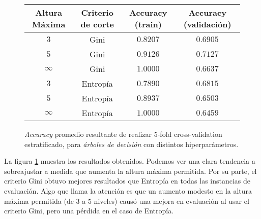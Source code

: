 \vspace{0.5em}
\begin{figure}[!htbp]
    \begin{center}
        \begin{tabular}{ |c|c|c|c| } 
         \hline
        Altura Máxima   & Criterio de corte & Accuracy (train)  & Accuracy (validación) \\
        \hline
        $3$             & Gini              &  $0.8207$         & $0.6905$  \\ 
        $5$             & Gini              &  $0.9126$         & $0.7127$  \\
        $\infty$        & Gini              &  $1.0000$         & $0.6637$  \\ 
        $3$             & Entropía          &  $0.7890$         & $0.6815$  \\
        $5$             & Entropía          &  $0.8937$         & $0.6503$  \\ 
        $\infty$        & Entropía          &  $1.0000$         & $0.6459$  \\ 
        \hline
        \end{tabular}
    \end{center}
    \caption{\textit{Accuracy} promedio resultante de realizar $5$-fold cross-validation estratificado, para \textit{árboles de decisión} con distintos hiperparámetros.} \label{grid_search}
\end{figure}

La figura \ref{grid_search} muestra los resultados obtenidos. Podemos ver una clara tendencia a sobreajustar a medida que aumenta la altura máxima permitida. Por su parte, el criterio Gini obtuvo mejores resultados que Entropía en todas las instancias de evaluación. Algo que llama la atención es que un aumento modesto en la altura máxima permitida (de $3$ a $5$ niveles) causó una mejora en evaluación al usar el criterio Gini, pero una pérdida en el caso de Entropía.
